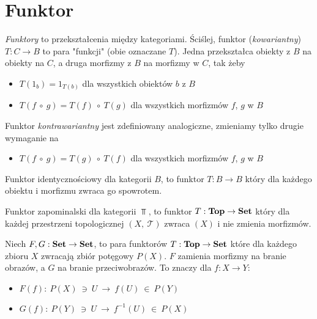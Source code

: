 \section{Funktor}


\emph{Funktory} to przekształcenia między kategoriami. Ściślej, funktor (\emph{kowariantny}) $T: C\to B$ to para "funkcji" (obie oznaczane $T$). Jedna przekształca obiekty z $B$ na obiekty na $C$, a druga morfizmy z $B$ na morfizmy w $C$, tak żeby
\begin{itemize}
\item $T(1_b) = 1_{T(b)}$ dla wszystkich obiektów $b$ z $B$
\item $T(f\  \circ\ g) = T(f)\ \circ\ T(g)$ dla wszystkich morfizmów $f$, $g$ w $B$
\end{itemize}
Funktor \emph{kontrawariantny} jest zdefiniowany analogiczne, zmieniamy tylko drugie wymaganie na
\begin{itemize}
	\item $T(f\  \circ\ g) = T(g)\ \circ\ T(f)$ dla wszystkich morfizmów $f$, $g$ w $B$
\end{itemize}

\begin{example}
	Funktor identycznościowy dla kategorii $B$, to funktor $T:B\to B$ który dla każdego obiektu i morfizmu zwraca go spowrotem.
\end{example}

\begin{example}
	Funktor zapominalski dla kategorii $\Top$, to funktor $T:\textbf{Top}\to \textbf{Set}$ który dla każdej przestrzeni topologicznej $(X,\  \mathcal T)$ zwraca  $(X)$ i nie zmienia morfizmów.
\end{example}

\begin{example}
	Niech $F, G: \textbf{Set} \to \textbf{Set}$, to para funktorów $T:\textbf{Top}\to \textbf{Set}$ które dla  każdego zbioru $X$ zwracają zbiór potęgowy $P(X)$. $F$ zamienia morfizmy  na branie obrazów, a $G$ na branie przeciwobrazów. To znaczy dla $f:X\to Y$:
	\begin{itemize}
		\item 	$F(f):\ P(X)\ \ni\ U\ \to\ f(U)\ \in\ P(Y)$
		\item 	$G(f):\ P(Y)\ \ni\ U\ \to\ f^{-1}(U)\ \in\ P(X)$
	\end{itemize}

\end{example}



